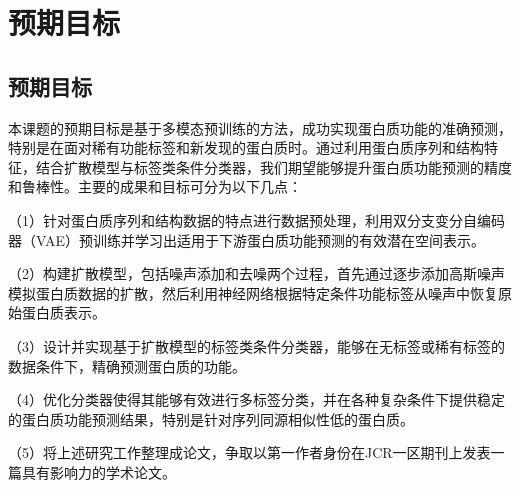 
\chapter{预期目标}
\section{预期目标}
本课题的预期目标是基于多模态预训练的方法，成功实现蛋白质功能的准确预测，特别是在面对稀有功能标签和新发现的蛋白质时。通过利用蛋白质序列和结构特征，结合扩散模型与标签类条件分类器，我们期望能够提升蛋白质功能预测的精度和鲁棒性。主要的成果和目标可分为以下几点：

（1）针对蛋白质序列和结构数据的特点进行数据预处理，利用双分支变分自编码器（VAE）预训练并学习出适用于下游蛋白质功能预测的有效潜在空间表示。

（2）构建扩散模型，包括噪声添加和去噪两个过程，首先通过逐步添加高斯噪声模拟蛋白质数据的扩散，然后利用神经网络根据特定条件功能标签从噪声中恢复原始蛋白质表示。

（3）设计并实现基于扩散模型的标签类条件分类器，能够在无标签或稀有标签的数据条件下，精确预测蛋白质的功能。

（4）优化分类器使得其能够有效进行多标签分类，并在各种复杂条件下提供稳定的蛋白质功能预测结果，特别是针对序列同源相似性低的蛋白质。

（5）将上述研究工作整理成论文，争取以第一作者身份在JCR一区期刊上发表一篇具有影响力的学术论文。